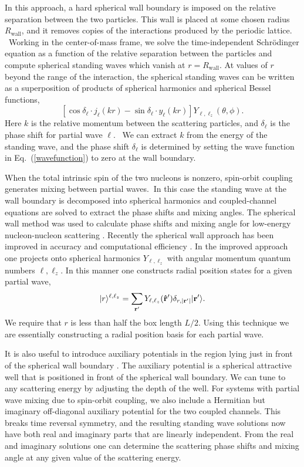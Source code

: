 In this approach, a hard spherical wall boundary is imposed on the relative separation between
the two particles.  This wall is placed at some chosen  radius $R_{\text{wall}}$, and it removes copies of the interactions produced by the periodic lattice.
\ Working in the center-of-mass frame, we solve the time-independent Schr{\"o}dinger equation as a function of the relative separation between the particles and compute spherical standing waves which vanish at $r=R_{\text{wall}}$.
At values of $r$ beyond the range of the interaction, the spherical standing
waves can be written as a superposition of products of spherical harmonics
and spherical Bessel functions,\begin{equation}
\left[  \cos\delta_{\ell}\cdot j_{\ell}(kr)-\sin\delta_{\ell}\cdot y_{\ell}(kr)\right]
Y_{\ell,\ell_{z}}(\theta,\phi). \label{wavefunction}%
\end{equation}
Here $k$ is the relative momentum between the scattering particles,
and $\delta_{\ell}$ is the phase shift for partial wave $\ell$. \ We can extract
$k$ from the energy of the standing wave, and the phase shift $\delta_{\ell}$
is determined by setting the wave function in Eq.~(\ref{wavefunction}) to
zero at the wall boundary.

When the total intrinsic spin of the two nucleons is nonzero,
spin-orbit coupling generates mixing between partial waves. $\ $In this case
the standing wave at the wall boundary is decomposed into spherical harmonics
and coupled-channel equations are solved to extract the phase shifts and
mixing angles.  The spherical wall method
was used to calculate phase shifts and mixing angle for low-energy nucleon-nucleon
scattering \cite{Borasoy:2007vi}.
Recently the spherical wall approach has been improved
in accuracy and computational efficiency \cite{Lu:2015riz}.
In the improved approach one projects onto spherical harmonics
$Y_{\ell,\ell_z}$ with angular momentum quantum numbers $\ell,\ell_z$.  In this manner one constructs radial position states for a given partial wave,
\begin{equation}
|r\rangle^{\ell,\ell_z} = \sum_{{\bf r'}}Y_{\ell,\ell_z}({\bf\hat{r}'})\delta_{r,|{\bf r'}|}|{\bf r'} \rangle.
\end{equation} We require that $r$ is less than half the box length $L/2$.
 Using this technique we are essentially constructing a radial position basis for each partial wave. 

It is also useful to introduce auxiliary potentials in the region lying just in front
of the spherical wall boundary \cite{Lu:2015riz}. The auxiliary potential
is a spherical attractive well that is positioned in front
of the spherical wall boundary.  We can tune to any scattering energy by
adjusting the depth of the well. For systems with partial wave mixing due
to spin-orbit coupling, we also include a Hermitian but imaginary off-diagonal
auxiliary potential
for the two coupled channels.  This breaks time reversal
symmetry, and the resulting standing wave solutions now have both real and imaginary
parts that are linearly independent.  From the real and imaginary solutions
one can determine the scattering phase shifts and mixing angle at any
given value of the scattering energy.

